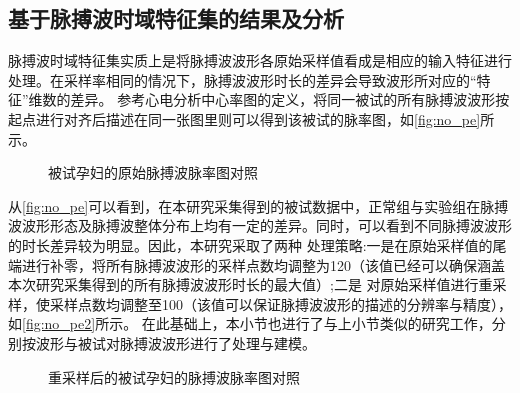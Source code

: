 \subsection{基于脉搏波时域特征集的结果及分析}

脉搏波时域特征集实质上是将脉搏波波形各原始采样值看成是相应的输入特征进行处理。在采样率相同的情况下，脉搏波波形时长的差异会导致波形所对应的“特征”维数的差异。
参考心电分析中心率图的定义，将同一被试的所有脉搏波波形按起点进行对齐后描述在同一张图里则可以得到该被试的脉率图，如\autoref{fig:no_pe}所示。
\begin{figure}[htbp]
      \centering
      \quad
      \quad
      \quad
      \caption{\label{fig:no_pe}被试孕妇的原始脉搏波脉率图对照}
\end{figure}

从\autoref{fig:no_pe}可以看到，在本研究采集得到的被试数据中，正常组与实验组在脉搏波波形形态及脉搏波整体分布上均有一定的差异。同时，可以看到不同脉搏波波形的时长差异较为明显。因此，本研究采取了两种
处理策略:一是在原始采样值的尾端进行补零，将所有脉搏波波形的采样点数均调整为120（该值已经可以确保涵盖本次研究采集得到的所有脉搏波波形时长的最大值）;二是
对原始采样值进行重采样，使采样点数均调整至100（该值可以保证脉搏波波形的描述的分辨率与精度），如\autoref{fig:no_pe2}所示。
在此基础上，本小节也进行了与上小节类似的研究工作，分别按波形与被试对脉搏波波形进行了处理与建模。

\begin{figure}[htbp]
      \centering
      \quad
      \quad
      \quad
      \caption{\label{fig:no_pe2}重采样后的被试孕妇的脉搏波脉率图对照}
\end{figure}

